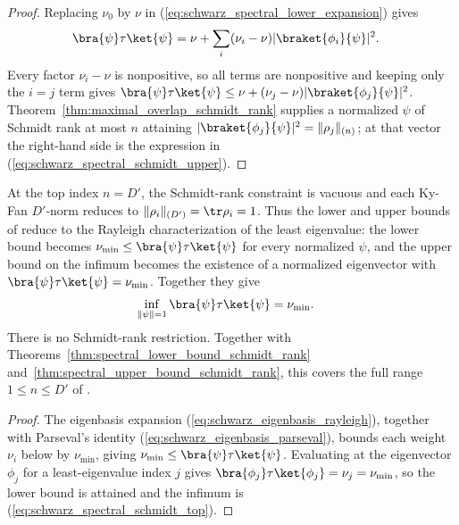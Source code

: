 \begin{proof}
    \leanok
    Replacing $\nu_0$ by $\nu$ in
    (\ref{eq:schwarz_spectral_lower_expansion}) gives
    \begin{align}
        \bra{\psi}\tau\ket{\psi}
         & =\nu+\sum_i(\nu_i-\nu)|\braket{\phi_i}{\psi}|^2.
        \notag
    \end{align}
    Every factor $\nu_i-\nu$ is nonpositive, so all terms are nonpositive and
    keeping only the $i=j$ term gives
    $\bra{\psi}\tau\ket{\psi}
        \le\nu+(\nu_j-\nu)|\braket{\phi_j}{\psi}|^2$.
    Theorem~\ref{thm:maximal_overlap_schmidt_rank} supplies a normalized
    $\psi$ of Schmidt rank at most $n$ attaining
    $|\braket{\phi_j}{\psi}|^2=\|\rho_j\|_{(n)}$; at that vector the
    right-hand side is the expression in
    (\ref{eq:schwarz_spectral_schmidt_upper}).
\end{proof}

\begin{theorem}
    \label{thm:spectral_bound_schmidt_rank_top}
    \leanok
    At the top index $n=D'$, the Schmidt-rank constraint is vacuous and each
    Ky-Fan $D'$-norm reduces to $\|\rho_i\|_{(D')}=\tr\rho_i=1$. Thus the
    lower and upper bounds of
    \cite[Chapter~3, Proposition~3.2]{Wolf2012Quantum} reduce to the Rayleigh
    characterization of the least eigenvalue: the lower bound becomes
    $\nu_{\min}\le\bra{\psi}\tau\ket{\psi}$ for every normalized $\psi$, and
    the upper bound on the infimum becomes the existence of a normalized
    eigenvector with
    $\bra{\psi}\tau\ket{\psi}=\nu_{\min}$. Together they give
    \begin{align}
        \inf_{\|\psi\|=1}\bra{\psi}\tau\ket{\psi}
         & =\nu_{\min}.
        \label{eq:schwarz_spectral_schmidt_top}
    \end{align}
    There is no Schmidt-rank restriction. Together with
    Theorems~\ref{thm:spectral_lower_bound_schmidt_rank}
    and~\ref{thm:spectral_upper_bound_schmidt_rank}, this covers the full
    range $1\le n\le D'$ of
    \cite[Chapter~3, Proposition~3.2]{Wolf2012Quantum}.
\end{theorem}

\begin{proof}
    \leanok
    The eigenbasis expansion (\ref{eq:schwarz_eigenbasis_rayleigh}), together
    with Parseval's identity (\ref{eq:schwarz_eigenbasis_parseval}), bounds
    each weight $\nu_i$ below by $\nu_{\min}$, giving
    $\nu_{\min}\le\bra{\psi}\tau\ket{\psi}$. Evaluating at the eigenvector
    $\phi_j$ for a least-eigenvalue index $j$ gives
    $\bra{\phi_j}\tau\ket{\phi_j}=\nu_j=\nu_{\min}$, so the lower bound is
    attained and the infimum is (\ref{eq:schwarz_spectral_schmidt_top}).
\end{proof}

